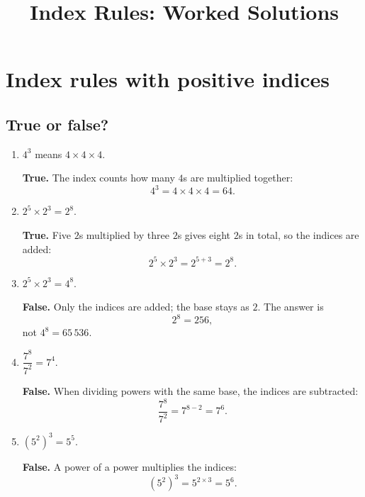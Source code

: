 \documentclass[11pt]{article}
\begin{document}
\title{Index Rules: Worked Solutions}
\author{}
\date{}
\maketitle

\section{Index rules with positive indices}

\subsection*{True or false?}
\begin{enumerate}
\item $4^3$ means $4\times4\times4$.

\textbf{True.} The index counts how many $4$s are multiplied together:
\[
4^3=4\times4\times4=64.
\]

\item $2^5\times2^3=2^8$.

\textbf{True.} Five $2$s multiplied by three $2$s gives eight $2$s in total, so the indices are added:
\[
2^5\times2^3=2^{5+3}=2^8.
\]

\item $2^5\times2^3=4^8$.

\textbf{False.} Only the indices are added; the base stays as $2$. The answer is
\[
2^8=256,
\]
not $4^8=65\,536$.

\item $\dfrac{7^8}{7^2}=7^4$.

\textbf{False.} When dividing powers with the same base, the indices are subtracted:
\[
\frac{7^8}{7^2}=7^{8-2}=7^6.
\]

\item $\left(5^2\right)^3=5^5$.

\textbf{False.} A power of a power multiplies the indices:
\[
\left(5^2\right)^3=5^{2\times3}=5^6.
\]
\end{enumerate}
\end{document}
